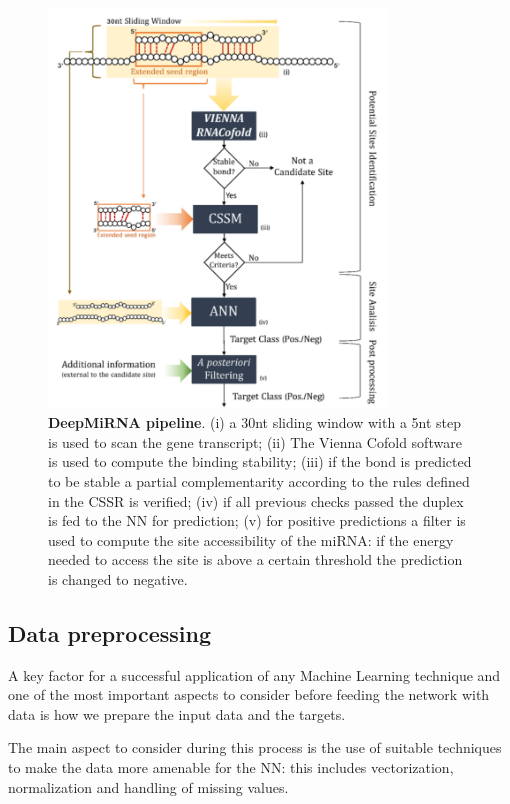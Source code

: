 \begin{figure}[hbt!]
	\centering
	\includegraphics[width=0.8\textwidth]{Figures/pipeline}
	\caption{\textbf{DeepMiRNA pipeline}. (i) a 30nt sliding window with a 5nt step is used to scan the gene transcript; (ii) The Vienna Cofold software is used to compute the binding stability; (iii) if the bond is predicted to be stable a partial complementarity according to the rules defined in the CSSR is verified; (iv) if all previous checks passed the duplex is fed to the NN for prediction; (v) for positive predictions a filter is used to compute the site accessibility of the miRNA: if the energy needed to access the site is above a certain threshold the prediction is changed to negative.}
	\label{fig:pipeline}
\end{figure}

\subsection{Data preprocessing}
A key factor for a successful application of any Machine Learning technique and one of the most important aspects to consider before feeding the network with data is how we prepare the input data and the targets.  

The main aspect to consider during this process is the use of suitable techniques to make the data more amenable for the NN: this includes vectorization, normalization and handling of missing values. 

